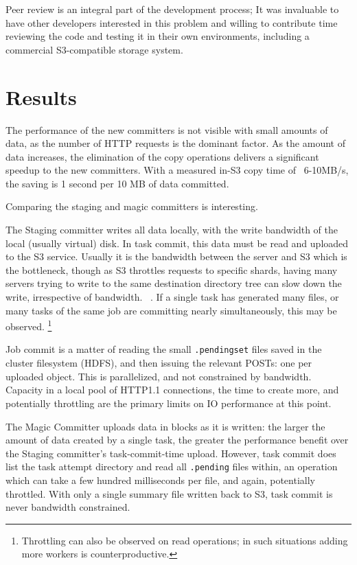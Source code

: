 \documentclass[format=acmsmall, screen=true, nonacm, timestamp, review=false]{acmart}
\begin{document}
Peer review is an integral part of the development process;
It was invaluable to have other developers interested in this problem
and willing to contribute time reviewing the code and testing it
in their own environments, including a commercial S3-compatible
storage system.



\section{Results}
\label{sec:results}


The performance of the new committers is not visible with small amounts
of data, as the number of HTTP requests is the dominant factor.
As the amount of data increases, the elimination of the copy operations
delivers a significant speedup to the new committers.
With a measured in-S3 copy time of ~6-10MB/s, the saving is 1 second per 10 MB
of data committed.

Comparing the staging and magic committers is interesting.

The Staging committer writes all data locally, with the write bandwidth
of the local (usually virtual) disk.
In task commit, this data must be read and uploaded to the S3 service.
Usually it is the bandwidth between the server and S3 which is the bottleneck,
though as S3 throttles requests to specific shards, having many servers trying
to write to the same destination directory tree can slow down the write, irrespective
of bandwidth.
\ \cite{AWS-S3-throttling}.
If a single task has generated many files, or many tasks of the same job are
committing nearly simultaneously, this may be observed.
\footnote{Throttling can also be observed on read operations;
in such situations adding more workers is counterproductive.}

Job commit is a matter of reading the small \texttt{.pendingset} files saved in the
cluster filesystem (HDFS), and then issuing the relevant POSTs: one per uploaded
object.
This is parallelized, and not constrained by bandwidth.
Capacity in a local pool of HTTP1.1 connections, the time to create more,
and potentially throttling are the primary limits on IO performance at this point.

The Magic Committer uploads data in blocks as it is written: the larger
the amount of data created by a single task, the greater the performance
benefit over the Staging committer's task-commit-time upload.
However, task commit does list the task attempt directory and read all \texttt{.pending}
files within, an operation which can take a few hundred milliseconds per file,
and again, potentially throttled.
With only a single summary file written back to S3, task commit is never
bandwidth constrained.
\end{document}
